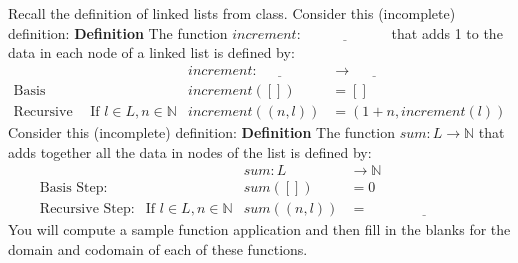 \documentclass[12pt, oneside]{article}
\begin{document}
\vfill
Recall the definition of linked lists from class.
Consider this (incomplete) definition:
{\bf Definition} The function $\textit{increment} : \underline{\hspace{6em}}$ 
that adds 1 to the data in each node of a linked list is defined by:
\[
\begin{array}{llll}
& & \textit{increment} : \underline{\hspace{3em}} & \to \underline{\hspace{3em}} \\
\textrm{Basis Step:} & & \textit{increment}([]) & = [] \\
\textrm{Recursive Step:} & \textrm{If } l \in L, n \in \mathbb{N} & \textit{increment}((n, l)) & = (1 + n, \textit{increment}(l))
\end{array}
\]
Consider this (incomplete) definition:
{\bf Definition} The function $\textit{sum} : L \to \mathbb{N}$ that adds 
together all the data in nodes of the list is defined by:
\[
\begin{array}{llll}
& & \textit{sum} : L & \to \mathbb{N} \\
\textrm{Basis Step:} & & \textit{sum}([]) & = 0 \\
\textrm{Recursive Step:} & \textrm{If } l \in L, n \in \mathbb{N} & \textit{sum}((n, l)) & = \underline{\hspace{8em}}
\end{array}
\]
You will compute a sample function application and then fill in the 
blanks for the domain and codomain of each of these functions.
\end{document}
